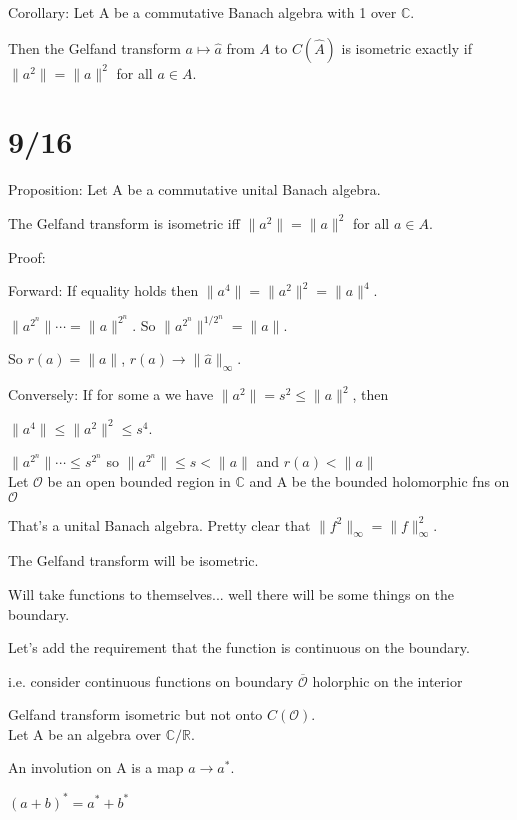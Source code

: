 \documentclass[12pt]{article}
\begin{document}
\noindent
Corollary: Let A be a commutative Banach algebra with 1 over $\mathds{C}$.

Then the Gelfand transform $a \mapsto \hat{a}$ from $A$ to $C(\hat{A})$ is isometric exactly if $\|a^2\| = \|a\|^2$ for all $a \in A$.

\section{9/16}

\noindent
Proposition: Let A be a commutative unital Banach algebra.

The Gelfand transform is isometric iff $\|a^2\| = \|a\|^2$ for all $a \in A$.

\noindent
Proof:

Forward: If equality holds then $\|a^4\| = \|a^2\|^2 = \|a\|^4$.

$\|a^{2^n}\| \cdots = \|a\|^{2^n}$. So $\|a^{2^n}\|^{1\slash{2^n}} = \|a\|$.

So $r(a) = \|a\|$, $r(a) \to \|\hat{a}\|_\infty$.

Conversely: If for some a we have $\|a^2\| = s^2 \leq \|a\|^2$, then

$\|a^4\| \leq \|a^2\|^2 \leq s^4$.

$\|a^{2^n}\|\cdots \leq s^{2^n}$ so $\|a^{2^n}\| \leq s < \|a\|$ and $r(a) < \|a\|$\\

\noindent
Let $\mathcal{O}$ be an open bounded region in $\mathds{C}$ and A be the bounded holomorphic fns on $\mathcal{O}$

That's a unital Banach algebra.  Pretty clear that $\|f^2\|_\infty = \|f\|_\infty^2$.

The Gelfand transform will be isometric.

Will take functions to themselves... well there will be some things on the boundary.

Let's add the requirement that the function is continuous on the boundary.

i.e. consider continuous functions on boundary $\overline{\mathcal{O}}$ holorphic on the interior

Gelfand transform isometric but not onto $C(\mathcal{O})$.\\

\noindent
Let A be an algebra over $\mathds{C}/\mathds{R}$.

An involution on A is a map $a \to a^*$.

$(a + b)^* = a^* + b^*$
\end{document}

